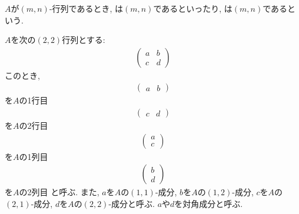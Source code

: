 \begin{definition}
  \label{def:mat:type}
  $A$が$(m,n)$-行列であるとき,
  は$(m,n)$であるといったり,
  は$(m,n)$であるという.
\end{definition}

$A$を次の$(2,2)$行列とする:
\begin{align*}
  \begin{pmatrix}
    a&b\\c&d
  \end{pmatrix}
\end{align*}
このとき,
\begin{align*}
  \begin{pmatrix}
    a&b
  \end{pmatrix}
\end{align*}
を$A$の1行目
\begin{align*}
  \begin{pmatrix}
    c&d
  \end{pmatrix}
\end{align*}
を$A$の2行目
\begin{align*}
  \begin{pmatrix}
    a\\c
  \end{pmatrix}
\end{align*}
を$A$の1列目
\begin{align*}
  \begin{pmatrix}
    b\\d
  \end{pmatrix}
\end{align*}
を$A$の2列目
と呼ぶ.
また,
$a$を$A$の$(1,1)$-成分,
$b$を$A$の$(1,2)$-成分,
$c$を$A$の$(2,1)$-成分,
$d$を$A$の$(2,2)$-成分と呼ぶ.
$a$や$d$を対角成分と呼ぶ.


